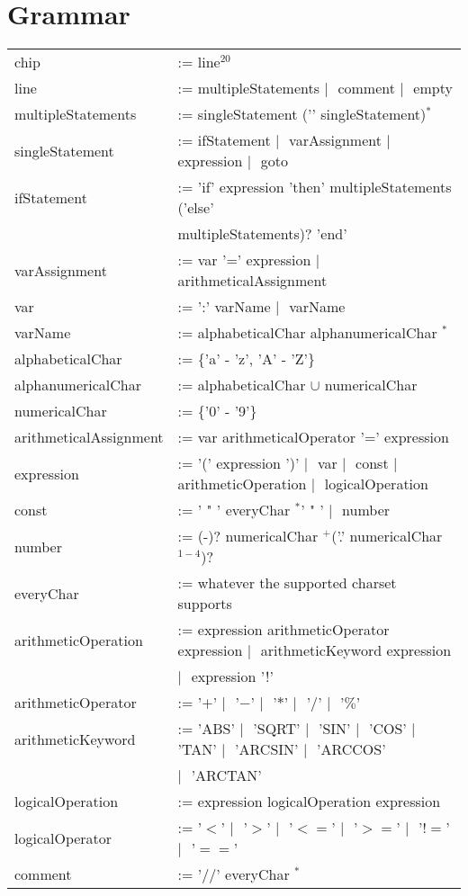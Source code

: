 \documentclass[]{scrartcl}
\newcommand{\pow}[1]{\ensuremath{^{#1}}}
\renewcommand{\star}{\ensuremath{^*}}
\newcommand{\plus}{\ensuremath{^+}}
\newcommand{\pipe}{\ensuremath{|\text{ }}}
\begin{document}
	\section*{Grammar}
	\begin{tabular}{ll}
		chip &:= line\pow{20} \\
		line &:= multipleStatements \pipe comment \pipe empty \\
		multipleStatements &:= singleStatement ('\textvisiblespace' singleStatement)\star \\
		singleStatement &:= ifStatement \pipe varAssignment \pipe expression \pipe goto \\
		ifStatement &:= 'if\textvisiblespace' expression '\textvisiblespace then\textvisiblespace' multipleStatements ('\textvisiblespace else\textvisiblespace' \\ & multipleStatements)? '\textvisiblespace end' \\
		varAssignment &:= var '=' expression \pipe arithmeticalAssignment \\
		var &:= ':' varName \pipe varName \\
		varName &:= alphabeticalChar alphanumericalChar \star \\
		alphabeticalChar &:= \{'a' - 'z', 'A' - 'Z'\} \\
		alphanumericalChar &:= alphabeticalChar $\cup$ numericalChar \\
		numericalChar &:= \{'0' - '9'\} \\
		arithmeticalAssignment & := var arithmeticalOperator '=' expression \\
		expression &:= '(' expression ')' \pipe var \pipe const \pipe arithmeticOperation \pipe logicalOperation \\
		const &:= ' " ' everyChar \star ' " ' \pipe number \\
		number &:= (-)? numericalChar \plus ('.' numericalChar$^{1 - 4}$)? \\
		everyChar &:= whatever the supported charset supports \\
		arithmeticOperation &:= expression arithmeticOperator expression \pipe arithmeticKeyword expression \\ & \pipe expression '!' \\
		arithmeticOperator &:= '$+$' \pipe '$-$' \pipe '$*$' \pipe '$/$' \pipe '$\%$' \\
		arithmeticKeyword &:= 'ABS' \pipe 'SQRT' \pipe 'SIN' \pipe 'COS' \pipe 'TAN' \pipe 'ARCSIN' \pipe 'ARCCOS' \\ & \pipe 'ARCTAN' \\
		logicalOperation &:= expression logicalOperation expression \\
		logicalOperator &:= '$<$' \pipe '$>$' \pipe '$<=$' \pipe '$>=$' \pipe '$!=$' \pipe '$==$' \\
		comment & := '$//$' everyChar \star \\
	\end{tabular}
\end{document}
